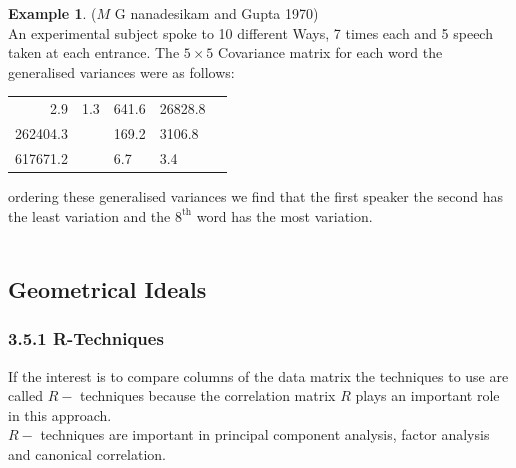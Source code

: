 \documentclass[11pt,a4paper]{article}
\theoremstyle{definition}
\newtheorem{exa}[thm]{Example}
\begin{document}
\begin{exa}
($M$ G nanadesikam and Gupta 1970)\\
An experimental subject spoke to 10 different Ways, 7 times each  and 5 speech taken at each entrance.
The $5\times 5$ Covariance matrix for each word the generalised variances were as follows:
\end{exa}

\begin{table}[H]
\centering
\begin{tabular}{rcllc}
2.9 & 1.3 & 641.6 & 26828.8\\
262404.3 & & 169.2 & 3106.8\\
617671.2 && 6.7 & 3.4\\
\end{tabular}
\end{table}


ordering these generalised variances we find that the first speaker the second has the least variation and the $8^{\text{th}}$ word has the most variation.\\\\


\subsection{Geometrical Ideals} 
\subsubsection*{3.5.1 R-Techniques}
If the interest is to compare columns of the data matrix the techniques to use are called $R-$ techniques because the correlation matrix $R$ plays an important role in this approach.\\
$R-$ techniques are important in principal component analysis, factor analysis and  canonical correlation.\\
\end{document}
